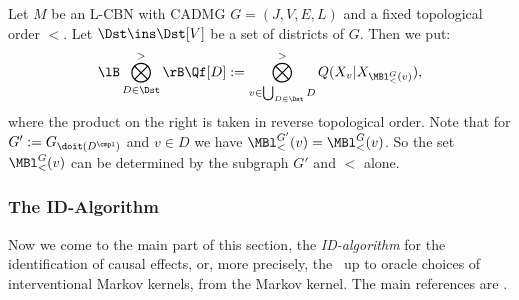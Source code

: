 \begin{Def}
    \label{not:Q-dist}
        Let $M$ be an L-CBN with \observational CADMG $G=(J,V,E,L)$ and a fixed topological order $<$.
        Let  $\Dst \ins \Dst[V]$ be a set of districts of $G$. Then we put:
         \[ \lB \bigotimes_{D \in \Dst}^>\rB \Qf[D] := \bigotimes_{v \in \bigcup_{D \in \Dst} D}^> Q(X_v|X_{\MBl^G_<(v)}),  \]
         where the product on the right is taken in reverse topological order.
         Note that for $G':=G_{\doit(D^\cmpl)}$ and $v \in D$ we have $\MBl_<^{G'}(v)=\MBl_<^G(v)$. So the set $\MBl_<^G(v)$ 
         can be determined by the subgraph $G'$ and $<$ alone.
\end{Def}




\subsubsection{The ID-Algorithm}

Now we come to the main part of this section, the \emph{ID-algorithm} for the identification of causal effects, or, more precisely, the \trackability\ up to oracle choices of interventional Markov kernels, from the \observational Markov kernel. 
The main references are \cite{Pearl09,GP95s,Tian2002,TP02s,Tian04s,SP06,HV06s,HV08s,RERS17,FM20}.

